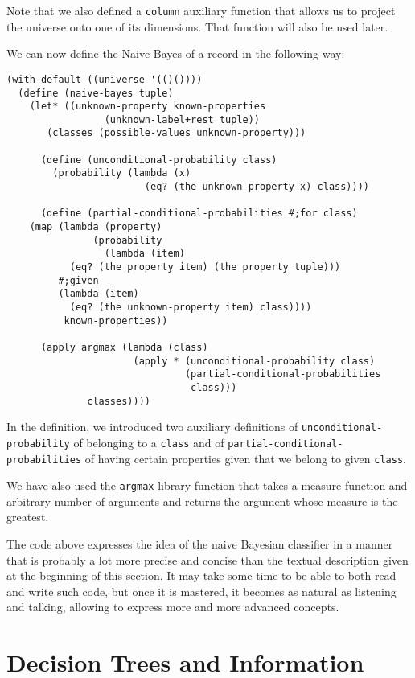 Note that we also defined a \texttt{column} auxiliary function
that allows us to project the universe onto one of its dimensions.
That function will also be used later.

We can now define the Naive Bayes of a record in the following way:

\begin{Verbatim}[samepage=true]
(with-default ((universe '(()())))
  (define (naive-bayes tuple)
    (let* ((unknown-property known-properties 
			     (unknown-label+rest tuple))
	   (classes (possible-values unknown-property)))

      (define (unconditional-probability class)
        (probability (lambda (x) 
                        (eq? (the unknown-property x) class))))

      (define (partial-conditional-probabilities #;for class)
	(map (lambda (property)
               (probability 
                 (lambda (item)
		   (eq? (the property item) (the property tuple)))
		 #;given
		 (lambda (item)
		   (eq? (the unknown-property item) class))))
	      known-properties))

      (apply argmax (lambda (class)
                      (apply * (unconditional-probability class)
                               (partial-conditional-probabilities
                                class)))
              classes))))
\end{Verbatim}

In the definition, we introduced two auxiliary definitions
of \texttt{unconditional\--probability} of belonging to a \texttt{class}
and of \texttt{partial\--conditional\--probabi\-lities} of having
certain properties given that we belong to given \texttt{class}.

We have also used the \texttt{argmax} library function that
takes a measure function and arbitrary number of arguments
and returns the argument whose measure is the greatest.

The code above expresses the idea of the naive Bayesian
classifier in a manner that is probably a lot more precise
and concise than the textual description given at the
beginning of this section. It may take some time to be able
to both read and write such code, but once it is mastered,
it becomes as natural as listening and talking, allowing to
express more and more advanced concepts.
\section{Decision Trees and Information}

